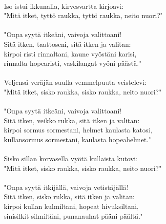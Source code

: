                                                                \\
Iso istui ikkunalla, kirvesvartta kirjoavi:                    \\
"Mitä itket, tyttö raukka, tyttö raukka, neito nuori?"         \\
                                                               \\
"Onpa syytä itkeäni, vaivoja valittoani!                       \\
Sitä itken, taattoseni, sitä itken ja valitan:                 \\
kirpoi risti rinnaltani, kaune vyöstäni karisi,                \\
rinnalta hopearisti, vaskilangat vyöni päästä."                \\
                                                               \\
Veljensä veräjän suulla vemmelpuuta veistelevi:                \\
"Mitä itket, sisko raukka, sisko raukka, neito nuori?"         \\
                                                               \\
"Onpa syytä itkeäni, vaivoja valittoani!                       \\
Sitä itken, veikko rukka, sitä itken ja valitan:               \\
kirpoi sormus sormestani, helmet kaulasta katosi,              \\
kullansormus sormestani, kaulasta hopeahelmet."                \\
                                                               \\
Sisko sillan korvasella vyötä kullaista kutovi:                \\
"Mitä itket, sisko raukka, sisko raukka, neito nuori?"         \\
                                                               \\
"Onpa syytä itkijällä, vaivoja vetistäjällä!                   \\
Sitä itken, sisko rukka, sitä itken ja valitan:                \\
kirpoi kullan kulmiltani, hopeat hivuksiltani,                 \\
sinisilkit silmiltäni, punanauhat pääni päältä."               \\
                                                               \\
